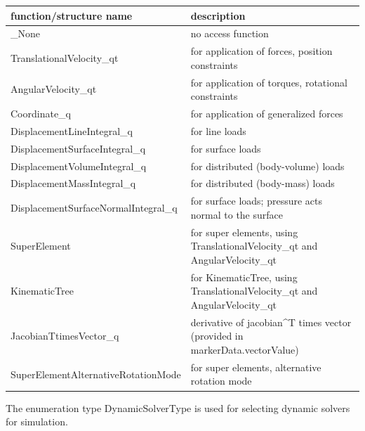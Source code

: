 \begin{center}
\footnotesize
\begin{longtable}{| p{8cm} | p{8cm} |} 
\hline
{\bf function/structure name} & {\bf description}\\ \hline
  \_None & no access function\\ \hline  
  TranslationalVelocity\_qt & for application of forces, position constraints\\ \hline  
  AngularVelocity\_qt & for application of torques, rotational constraints\\ \hline  
  Coordinate\_q & for application of generalized forces\\ \hline  
  DisplacementLineIntegral\_q & for line loads\\ \hline  
  DisplacementSurfaceIntegral\_q & for surface loads\\ \hline  
  DisplacementVolumeIntegral\_q & for distributed (body-volume) loads\\ \hline  
  DisplacementMassIntegral\_q & for distributed (body-mass) loads\\ \hline  
  DisplacementSurfaceNormalIntegral\_q & for surface loads; pressure acts normal to the surface\\ \hline  
  SuperElement & for super elements, using TranslationalVelocity\_qt and AngularVelocity\_qt\\ \hline  
  KinematicTree & for KinematicTree, using TranslationalVelocity\_qt and AngularVelocity\_qt\\ \hline  
  JacobianTtimesVector\_q & derivative of jacobian^T times vector (provided in markerData.vectorValue)\\ \hline  
  SuperElementAlternativeRotationMode & for super elements, alternative rotation mode\\ \hline  
\end{longtable}
\end{center}

\label{sec:DynamicSolverType}
The enumeration type  DynamicSolverType is used for selecting dynamic solvers for simulation.



